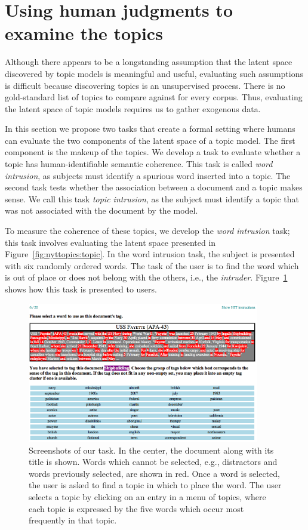 \section{Using human judgments to examine the topics}
\label{sec:tasks}
Although there appears to be a longstanding assumption that the latent
space discovered by topic models is meaningful and useful, evaluating
such assumptions is difficult because discovering topics is an
unsupervised process.  There is no gold-standard list of topics to
compare against for every corpus.  Thus, evaluating the latent space
of topic models requires us to gather exogenous data.

In this section we propose two tasks that create a formal setting
where humans can evaluate the two components of the latent space of a
topic model.  The first component is the makeup of the topics.  We
develop a task to evaluate whether a topic has human-identifiable
semantic coherence.  This task is called \emph{word intrusion}, as
subjects must identify a spurious word inserted into a topic.  The
second task tests whether the association between a document and a
topic makes sense.  We call this task \emph{topic intrusion}, as the
subject must identify a topic that was not associated with the
document by the model.

To measure the coherence of these topics, we develop the \emph{word
  intrusion} task; this task involves evaluating the latent space
presented in Figure~\ref{fig:nyttopics:topic}.  In the word intrusion
task, the subject is presented with six randomly ordered words.  The
task of the user is to find the word which is out of place or does not
belong with the others, i.e., the \emph{intruder}.
Figure~\ref{fig:screenshot} shows how this task is presented to
users.

\begin{figure}[t]
\centering
\includegraphics[width=0.90\textwidth]{figures/screenshots.png}
\caption{Screenshots of our task.  In the center, the document along
  with its title is shown.  Words which cannot be selected, e.g.,
  distractors and words previously selected, are shown in red.  Once a
  word is selected, the user is asked to find a topic in which to
  place the word.  The user selects a topic by clicking on an entry in
  a menu of topics, where each topic is expressed by the five words
  which occur most frequently in that topic.}
\label{fig:screenshot}
\end{figure}

